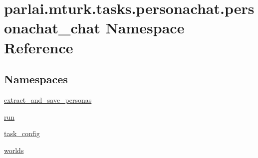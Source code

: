 \hypertarget{namespaceparlai_1_1mturk_1_1tasks_1_1personachat_1_1personachat__chat}{}\section{parlai.\+mturk.\+tasks.\+personachat.\+personachat\+\_\+chat Namespace Reference}
\label{namespaceparlai_1_1mturk_1_1tasks_1_1personachat_1_1personachat__chat}
\subsection*{Namespaces}
\begin{DoxyCompactItemize}
\item 
 \hyperlink{namespaceparlai_1_1mturk_1_1tasks_1_1personachat_1_1personachat__chat_1_1extract__and__save__personas}{extract\+\_\+and\+\_\+save\+\_\+personas}
\item 
 \hyperlink{namespaceparlai_1_1mturk_1_1tasks_1_1personachat_1_1personachat__chat_1_1run}{run}
\item 
 \hyperlink{namespaceparlai_1_1mturk_1_1tasks_1_1personachat_1_1personachat__chat_1_1task__config}{task\+\_\+config}
\item 
 \hyperlink{namespaceparlai_1_1mturk_1_1tasks_1_1personachat_1_1personachat__chat_1_1worlds}{worlds}
\end{DoxyCompactItemize}
